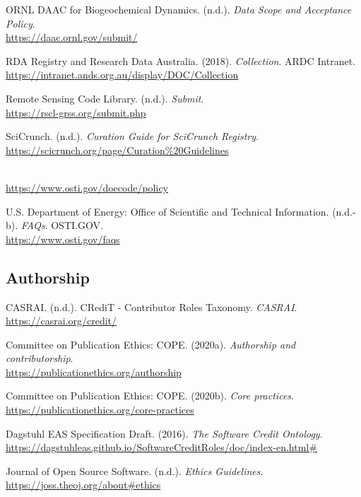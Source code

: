 \documentclass[11pt]{article}
\begin{document}
ORNL DAAC for Biogeochemical Dynamics. (n.d.). 
\emph{Data Scope and Acceptance Policy}.\\
\url{https://daac.ornl.gov/submit/}

RDA Registry and Research Data Australia. (2018). \emph{Collection}.
ARDC Intranet.\\
\url{https://intranet.ands.org.au/display/DOC/Collection}

Remote Sensing Code Library. (n.d.). \emph{Submit}.\\
\url{https://rscl-grss.org/submit.php}

SciCrunch. (n.d.). \emph{Curation Guide for SciCrunch Registry}.\\
\url{https://scicrunch.org/page/Curation\%20Guidelines}

\\
\url{https://www.osti.gov/doecode/policy}

U.S. Department of Energy: Office of Scientific and Technical
Information. (n.d.-b). \emph{FAQs}. OSTI.GOV.\\
\url{https://www.osti.gov/faqs}


\vspace*{-2pt}
\subsection{Authorship}
\label{authorship}

CASRAI. (n.d.). CRediT - Contributor Roles Taxonomy. \emph{CASRAI}.\\
\url{https://casrai.org/credit/}

Committee on Publication Ethics: COPE. (2020a). \emph{Authorship and
contributorship}.\\
\url{https://publicationethics.org/authorship}

Committee on Publication Ethics: COPE. (2020b). \emph{Core practices}.\\
\url{https://publicationethics.org/core-practices}

Dagstuhl EAS Specification Draft. (2016). \emph{The Software Credit
Ontology}.\\
\url{https://dagstuhleas.github.io/SoftwareCreditRoles/doc/index-en.html\#}

Journal of Open Source Software. (n.d.). \emph{Ethics Guidelines}.\\
\url{https://joss.theoj.org/about\#ethics}
\end{document}
